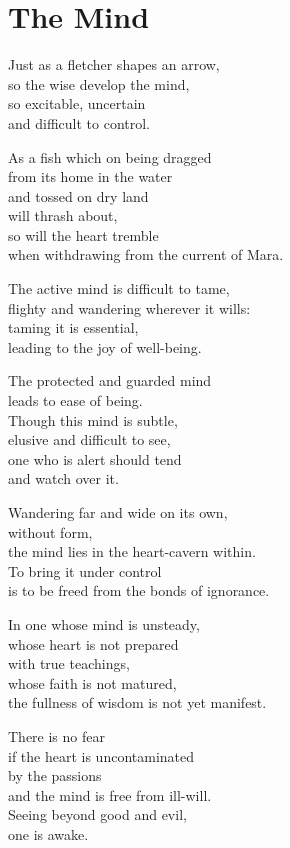 
\chapter{The Mind}


Just as a fletcher shapes an arrow,\\
so the wise develop the mind,\\
so excitable, uncertain\\
and difficult to control.

As a fish which on being dragged\\
from its home in the water\\
and tossed on dry land\\
will thrash about,\\
so will the heart tremble\\
when withdrawing from the current of Mara.


The active mind is difficult to tame,\\
flighty and wandering wherever it wills:\\
taming it is essential,\\
leading to the joy of well-being.


The protected and guarded mind\\
leads to ease of being.\\
Though this mind is subtle,\\
elusive and difficult to see,\\
one who is alert should tend\\
and watch over it.


Wandering far and wide on its own,\\
without form,\\
the mind lies in the heart-cavern within.\\
To bring it under control\\
is to be freed from the bonds of ignorance.


In one whose mind is unsteady,\\
whose heart is not prepared\\
with true teachings,\\
whose faith is not matured,\\
the fullness of wisdom is not yet manifest.


There is no fear\\
if the heart is uncontaminated\\
by the passions\\
and the mind is free from ill-will.\\
Seeing beyond good and evil,\\
one is awake.

